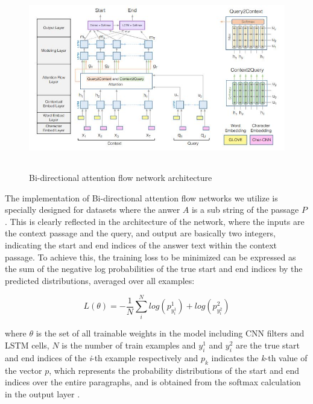 \documentclass[11pt,a4paper]{article}
\begin{document}
\begin{figure}
  \includegraphics[width=\textwidth,height=8cm]{bidaf_architecture.JPG}
  \caption{Bi-directional attention flow network architecture}
\end{figure}


The implementation of Bi-directional attention flow networks we utilize  \cite{bidaf:2017} is specially designed for datasets where the anwer $A$ is a sub string of the passage $P$. This is clearly reflected in the architecture of the network, where the inputs are the context passage and the query, and output are basically two integers, indicating the start and end indices of the answer text within the context passage. To achieve this, the training loss to be minimized can be expressed as the sum of the negative log probabilities of the true start and end indices by the predicted distributions, averaged over all examples:

$$
L(\theta)  = - \frac{1}{N} \sum^N_i log(p^1_{y^1_i}) + log(p^2_{y^2_i})
$$

where $\theta$ is the set of all trainable weights in the model including CNN filters and LSTM cells, $N$ is the number of train examples and $y^1_i$ and $y^2_i$ are the true start and end indices of the \textit{i}-th example respectively and $p_k$ indicates the \textit{k}-th value of the vector $p$, which represents the probability distributions of the start and end indices over the entire paragraphs, and is obtained from the softmax calculation in the output layer \cite{bidaf:2017}.

%
\end{document}
